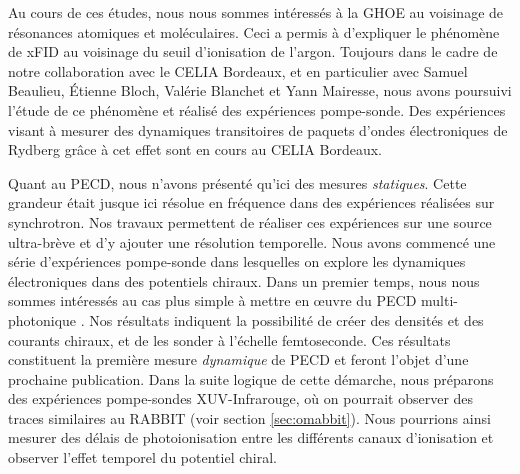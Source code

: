 Au cours de ces études, nous nous sommes intéressés à la GHOE au voisinage de résonances atomiques et moléculaires. Ceci a permis à  d'expliquer le phénomène de xFID au voisinage du seuil d'ionisation de l'argon. Toujours dans le cadre de notre collaboration avec le CELIA Bordeaux, et en particulier avec Samuel Beaulieu, \'Etienne Bloch, Valérie Blanchet et Yann Mairesse, nous avons poursuivi l'étude de ce phénomène et réalisé des expériences pompe-sonde. Des expériences visant à mesurer des dynamiques transitoires de paquets d'ondes électroniques de Rydberg grâce à cet effet sont en cours au CELIA Bordeaux.

Quant au PECD, nous n'avons présenté qu'ici des mesures \textit{statiques}. Cette grandeur était jusque ici résolue en fréquence dans des expériences réalisées sur synchrotron. Nos travaux permettent de réaliser ces expériences sur une source ultra-brève et d'y ajouter une résolution temporelle. Nous avons commencé une série d'expériences pompe-sonde dans lesquelles on explore les dynamiques électroniques dans des potentiels chiraux. Dans un premier temps, nous nous sommes intéressés au cas plus simple à mettre en œuvre du PECD multi-photonique . Nos résultats indiquent la possibilité de créer des densités et des courants chiraux, et de les sonder à l'échelle femtoseconde. Ces résultats constituent la première mesure \textit{dynamique} de PECD et feront l'objet d'une prochaine publication. Dans la suite logique de cette démarche, nous préparons des expériences pompe-sondes XUV-Infrarouge, où on pourrait observer des traces similaires au RABBIT (voir section \ref{sec:omabbit}). Nous pourrions ainsi mesurer des délais de photoionisation entre les différents canaux d'ionisation et observer l'effet temporel du potentiel chiral. 

